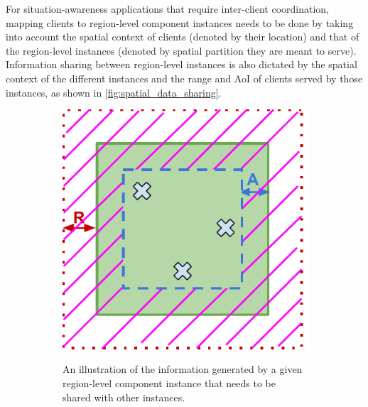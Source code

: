\par For situation-awareness applications that require inter-client coordination, mapping clients to region-level component instances needs to be done by taking into account the spatial context of clients (denoted by their location) and that of the region-level instances (denoted by spatial partition they are meant to serve). Information sharing between region-level instances is also dictated by the spatial context of the different instances and the range and AoI of clients served by those instances, as shown in \cref{fig:spatial_data_sharing}. 
\begin{figure}
\centering
\begin{subfigure}{0.4\textwidth}
  \centering
  \includegraphics[width=\linewidth]{figures/mechanisms/spatial_ctx_mgmt/out_data.pdf}
  \label{fig:spatial_ctx_out_data}
  \caption{An illustration of the information generated by a given region-level component instance that needs to be shared with other instances.}
\end{subfigure}%
~~~
\begin{subfigure}{0.4\textwidth}
  \centering

\end{subfigure}
\end{figure}
